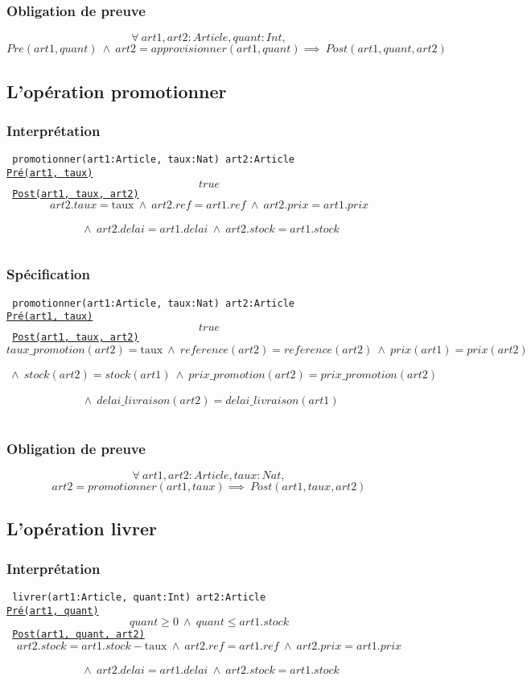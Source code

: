 \documentclass{article}
\begin{document}
\subsubsection{Obligation de preuve}
$$ \forall\ art1,art2:Article, quant:Int,$$
$$ Pre(art1,quant)\ \wedge\ art2 = approvisionner(art1,quant) \implies\ Post(art1, quant, art2) $$

\subsection{L'opération promotionner}
\subsubsection{Interprétation}
{\tt
promotionner(art1:Article, taux:Nat) art2:Article\\
\underline{Pré(art1, taux)}
$$ true $$
\underline{Post(art1, taux, art2)}
$$ art2.taux = \text{taux}\ \wedge\ art2.ref = art1.ref\ \wedge\ art2.prix = art1.prix$$
$$ \ \wedge\ art2.delai = art1.delai\ \wedge\  art2.stock = art1.stock$$
}

\subsubsection{Spécification}
{\tt
promotionner(art1:Article, taux:Nat) art2:Article\\
\underline{Pré(art1, taux)}
$$ true $$
\underline{Post(art1, taux, art2)}
$$ taux\_promotion(art2) = \text{taux}\ \wedge\ reference(art2) = reference(art2)\ \wedge\ prix(art1) = prix(art2) $$
$$ \ \wedge\ stock(art2) = stock(art1)\ \wedge\ prix\_promotion(art2) = prix\_promotion(art2)$$
$$ \ \wedge\ delai\_livraison(art2) = delai\_livraison(art1)$$
}

\subsubsection{Obligation de preuve}
$$ \forall\ art1,art2:Article, taux:Nat,$$
$$ art2 = promotionner(art1,taux) \implies\ Post(art1, taux, art2) $$

\subsection{L'opération livrer}
\subsubsection{Interprétation}
{\tt
livrer(art1:Article, quant:Int) art2:Article\\
\underline{Pré(art1, quant)}
$$ quant \ge 0\ \wedge\ quant \le art1.stock $$
\underline{Post(art1, quant, art2)}
$$ art2.stock = art1.stock - \text{taux}\ \wedge\ art2.ref = art1.ref\ \wedge\ art2.prix = art1.prix$$
$$ \ \wedge\ art2.delai = art1.delai\ \wedge\  art2.stock = art1.stock$$
}
\end{document}

